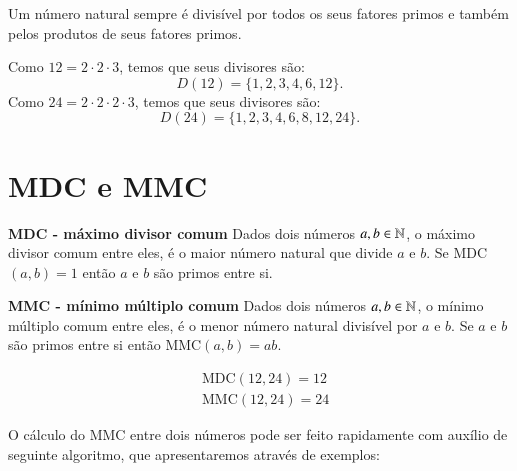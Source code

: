  \begin{obs}
 Um número natural sempre é divisível por todos os seus fatores primos e também pelos produtos de seus fatores primos.
 \end{obs}

 \begin{exem}
 Como $12= 2 \cdot 2 \cdot 3$, temos que seus divisores são: \[D(12)= \{1, 2, 3, 4, 6, 12\}.\]
 Como $24= 2 \cdot 2 \cdot 2 \cdot 3$, temos que seus divisores são: \[D(24)= \{1, 2, 3, 4, 6, 8, 12, 24\}.\]
 \end{exem}

 \section{MDC e MMC}

 \vskip0.3cm
 \colorbox{azul}{
 \begin{minipage}{0.9\linewidth}
 \begin{center}
  \textbf{MDC - máximo divisor comum}
  Dados dois números $a, b \in \mathbb{N}$, o máximo divisor comum entre eles, é o maior número natural que divide $a$ e $b$. Se MDC$(a, b)= 1$ então $a$ e $b$ são primos entre si.
 \end{center}
 \end{minipage}}

 \vskip0.3cm

 \colorbox{azul}{
 \begin{minipage}{0.9\linewidth}
 \begin{center}
 \textbf{MMC - mínimo múltiplo comum}
 Dados dois números $a, b \in \mathbb{N}$, o mínimo múltiplo comum entre eles, é o menor número natural divisível por $a$ e $b$. Se $a$ e $b$ são primos entre si então MMC$(a, b)= ab$.
 \end{center}
 \end{minipage}}


 \begin{exem}
 \begin{align*}
 & \text{MDC}(12, 24)= 12 \\
 & \text{MMC}(12, 24)= 24
 \end{align*}
 \end{exem}

 O cálculo do MMC entre dois números pode ser feito rapidamente com auxílio de seguinte algoritmo, que apresentaremos através de exemplos:

